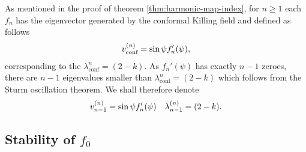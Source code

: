 As mentioned in the proof of theorem \ref{thm:harmonic-map-index}, for
$n\ge1$ each $f_n$ has the eigenvector generated by the conformal
Killing field and defined as follows
\begin{align}
  \label{eq:50}
  \vn{\text{conf}}{n}=\sin\psi f_n'(\psi),
\end{align}
corresponding to the $\lambda_{\text{conf}}^n=(2-k)$. As $f_n'(\psi)$
has exactly $n-1$ zeroes, there are $n-1$ eigenvalues smaller than
$\lambda_{\text{conf}}^n=(2-k)$ which follows from the Sturm
oscillation theorem. We shall therefore denote
\begin{align}
  \label{eq:51}
  \vn{n-1}{n}=\sin\psi f_n'(\psi)\quad
  \lb{n}{n-1}=(2-k).
\end{align}

\subsection{Stability of $f_0$}
\label{sec:stability-f_0}


